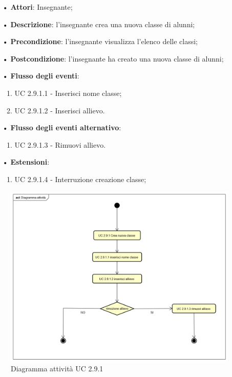 \begin{itemize}
	\item[•] \textbf{Attori}: Insegnante;
	\item[•] \textbf{Descrizione}: l'insegnante crea una nuova classe di alunni;
	\item[•] \textbf{Precondizione}: l'insegnante visualizza l'elenco delle classi;
	\item[•] \textbf{Postcondizione}: l'insegnante ha creato una nuova classe di alunni;
	\item[•] \textbf{Flusso degli eventi}:
	\begin{enumerate}
		\item UC 2.9.1.1 - Inserisci nome classe;
		\item UC 2.9.1.2 - Inserisci allievo.
	\end{enumerate}
	\item[•] \textbf{Flusso degli eventi alternativo}:
	\begin{enumerate}
		\item UC 2.9.1.3 - Rimuovi allievo.
	\end{enumerate}
	\item[•] \textbf{Estensioni}:	
	\begin{enumerate}
		\item UC 2.9.1.4 - Interruzione creazione classe;
	\end{enumerate}
	 
\end{itemize}

\begin{figure}[H]
	\centering
	\includegraphics[width=17cm]{img/Diagramma_attivita_crea_classe.png} 
	\caption{Diagramma attività UC 2.9.1}
\end{figure}


